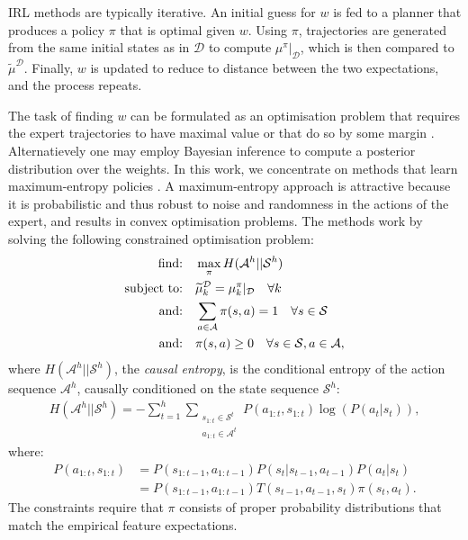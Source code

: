 \documentclass[a4paper,11pt]{report}
\begin{document}
IRL methods are typically iterative. An initial guess for $w$ is fed to a planner that produces a policy $\pi$ that is optimal given $w$.  Using $\pi$, trajectories are generated from the same initial states as in $\mathcal{D}$ to compute $\mu^{\pi}|_{\mathcal{D}}$, which is then compared to $\widetilde{\mu}^{\mathcal{D}}$.  Finally, $w$ is updated to reduce to distance between the two expectations, and the process repeats.

The task  of finding $w$ can be formulated as an optimisation problem that requires the expert trajectories to have maximal value \cite{abbeel2004apprenticeship} or that do so by some margin \cite{ratliff2006maximum}. Alternatievely one may employ Bayesian inference \cite{ramachandran2007bayesian,dimitrakakis2012bayesian} to compute a posterior distribution over the weights.  In this work, we concentrate on methods that learn maximum-entropy policies \cite{ziebart2008maximum,ziebart2010modelingthesis}.  A maximum-entropy approach is attractive because it is probabilistic and thus robust to noise and randomness in the actions of the expert, and results in convex optimisation problems. The methods work by solving the following constrained optimisation problem:
\begin{align}
	\hbox{find:} &\quad\max\limits_{\pi} H(\mathcal{A}^h||\mathcal{S}^h)\label{eq:primal_obj}\\
\hbox{subject to:}&\quad\widetilde{\mu}^{\mathcal{D}}_k   = \mu^{\pi}_k|_{\mathcal{D}}\quad\forall k \label{eq:features_equality_constraint}\\
\hbox{and:} &\quad\sum_{a\in\mathcal{A}}\pi(s,a)  = 1\quad\forall s\in\mathcal{S}\\
\hbox{and:} &\quad\pi(s,a) \geq 0\quad\forall s\in\mathcal{S},a\in\mathcal{A},\label{eq:positive_policy}
\end{align}
where $H(\mathcal{A}^h||\mathcal{S}^h)$, the \emph{causal entropy}, is the conditional entropy of the action sequence $\mathcal{A}^h$, causally conditioned on the state sequence $\mathcal{S}^h$:
\begin{align}
H(\mathcal{A}^h||\mathcal{S}^h) = -\sum_{t=1}^h \sum_{\substack{s_{1:t}\in\mathcal{S}^t\\a_{1:t}\in\mathcal{A}^t}} P(a_{1:t},s_{1:t})\log(P(a_t|s_t)),
\label{eg:entdef}
\end{align}
where:
\begin{align*}
  P(a_{1:t},s_{1:t})&= P(s_{1:t-1},a_{1:t-1})P(s_t|s_{t-1},a_{t-1})P(a_t|s_t)\\
  &=P(s_{1:t-1},a_{1:t-1})T(s_{t-1},a_{t-1},s_t)\pi(s_t,a_t).
\end{align*}
The constraints require that $\pi$ consists of proper probability distributions that match the empirical feature expectations.
\end{document}
